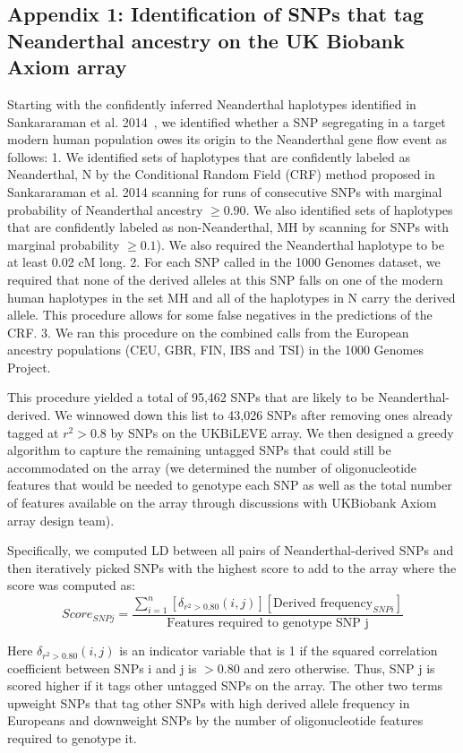 \subsection{Appendix 1: Identification of SNPs that tag Neanderthal ancestry on the UK Biobank Axiom array}
\label{asec:1}
Starting with the confidently inferred Neanderthal haplotypes identified in Sankararaman et al. 2014~\cite{sankararaman2014genomic}, we identified whether a SNP segregating in a target modern human population owes its origin to the Neanderthal gene flow event as follows:
1. We identified sets of haplotypes that are confidently labeled as Neanderthal, N by the Conditional Random Field (CRF) method proposed in Sankararaman et al. 2014 scanning for runs of consecutive SNPs with marginal probability of Neanderthal ancestry $\ge0.90$. We also identified sets of haplotypes that are confidently labeled as non-Neanderthal, MH by scanning for SNPs with marginal probability $\ge0.1$). We also required the Neanderthal haplotype to be at least 0.02 cM long.
2. For each SNP called in the 1000 Genomes dataset, we required that none of the derived alleles at this SNP falls on one of the modern human haplotypes in the set MH and all of the haplotypes in N carry the derived allele. This procedure allows for some false negatives in the predictions of the CRF.
3. We ran this procedure on the combined calls from the European ancestry populations (CEU, GBR, FIN, IBS and TSI) in the 1000 Genomes Project.
 
This procedure yielded a total of 95,462 SNPs that are likely to be Neanderthal-derived. We winnowed down this list to 43,026 SNPs after removing ones already tagged at $r^2>0.8$ by SNPs on the UKBiLEVE array. We then designed a greedy algorithm to capture the remaining untagged SNPs that could still be accommodated on the array (we determined the number of oligonucleotide features that would be needed to genotype each SNP as well as the total number of features available on the array through discussions with UKBiobank Axiom array design team).

Specifically, we computed LD between all pairs of Neanderthal-derived SNPs and then iteratively picked SNPs with the highest score to add to the array where the score was computed as:
$$Score_{SNP j}  =  \frac{\sum_{i=1}^n  [\delta_{r^2>0.80}(i,j)][\text{Derived frequency}_{SNP i}]}{\text{Features required to genotype SNP j}}$$

Here $\delta_{r^2>0.80}(i,j)$ is an indicator variable that is 1 if the squared correlation coefficient between SNPs i and j is $>0.80$ and zero otherwise. Thus, SNP j is scored higher if it tags other untagged SNPs on the array. The other two terms upweight SNPs that tag other SNPs with high derived allele frequency in Europeans and downweight SNPs by the number of oligonucleotide features required to genotype it.

